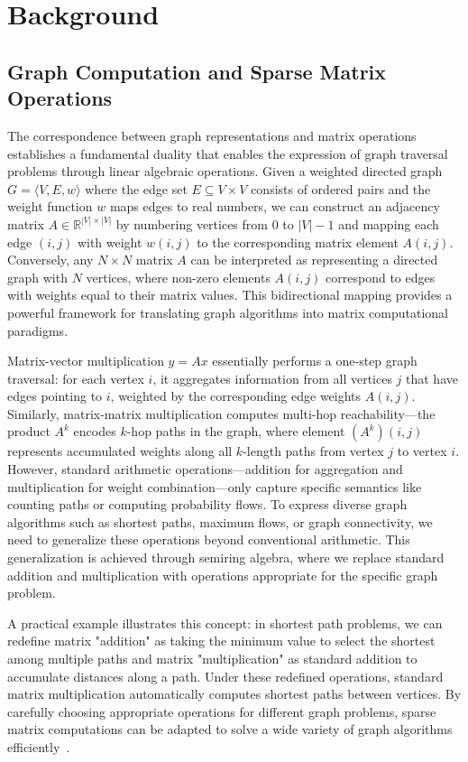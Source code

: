 \section{Background}
\subsection{Graph Computation and Sparse Matrix Operations}
The correspondence between graph representations and matrix operations establishes a fundamental duality that enables the expression of graph traversal problems through linear algebraic operations.
Given a weighted directed graph $G = \langle V, E, w \rangle$ where the edge set $E \subseteq V \times V$ consists of ordered pairs and the weight function $w$ maps edges to real numbers, 
we can construct an adjacency matrix $A \in \mathbb{R}^{|V| \times |V|}$ by numbering vertices from $0$ to $|V|-1$ and mapping each edge $(i,j)$ with weight $w(i,j)$ to the corresponding matrix element $A(i,j)$.
Conversely, any $N \times N$ matrix $A$ can be interpreted as representing a directed graph with $N$ vertices, where non-zero elements $A(i,j)$ correspond to edges with weights equal to their matrix values.
This bidirectional mapping provides a powerful framework for translating graph algorithms into matrix computational paradigms.

Matrix-vector multiplication $y = Ax$ essentially performs a one-step graph traversal: for each vertex $i$, 
it aggregates information from all vertices $j$ that have edges pointing to $i$, weighted by the corresponding edge weights $A(i,j)$.
Similarly, matrix-matrix multiplication computes multi-hop reachability—the product $A^k$ encodes $k$-hop paths in the graph, 
where element $(A^k)(i,j)$ represents accumulated weights along all $k$-length paths from vertex $j$ to vertex $i$.
However, standard arithmetic operations—addition for aggregation and multiplication for weight combination—only capture specific semantics 
like counting paths or computing probability flows.
To express diverse graph algorithms such as shortest paths, maximum flows, or graph connectivity, 
we need to generalize these operations beyond conventional arithmetic.
This generalization is achieved through semiring algebra, 
where we replace standard addition and multiplication with operations appropriate for the specific graph problem.

A practical example illustrates this concept: in shortest path problems, 
we can redefine matrix "addition" as taking the minimum value to select the shortest among multiple paths and matrix "multiplication" 
as standard addition to accumulate distances along a path.
Under these redefined operations, standard matrix multiplication automatically computes shortest paths between vertices.
By carefully choosing appropriate operations for different graph problems, 
sparse matrix computations can be adapted to solve a wide variety of graph algorithms efficiently~\cite{Tarjan}.

